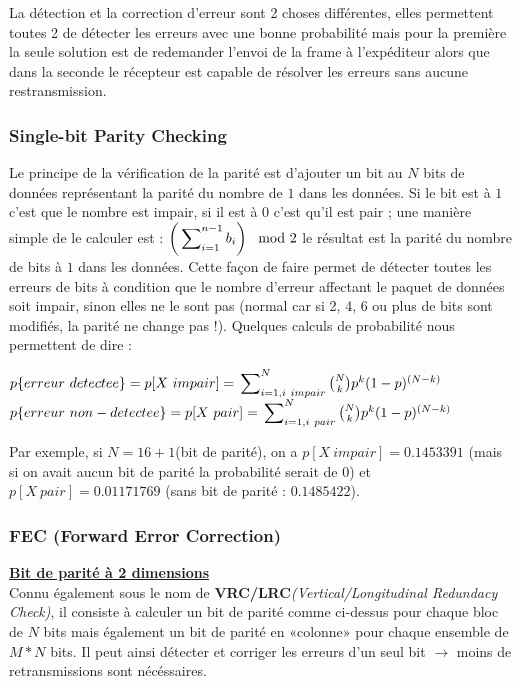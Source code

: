 \documentclass{article}
\newcommand{\sumin}[3]{\sideset{}{_{i=#1}^{#2}}\sum{#3}}
\begin{document}
La détection et la correction d'erreur sont 2 choses différentes, elles permettent toutes 2 de détecter les 
erreurs avec une bonne probabilité mais pour la première la seule solution est de redemander l'envoi de la frame 
à l'expéditeur alors que dans la seconde le récepteur est capable de résolver les erreurs sans aucune 
restransmission.

\subsubsection{Single-bit Parity Checking}

Le principe de la vérification de la parité est d'ajouter un bit au $N$ bits de données représentant la parité du
nombre de $1$ dans les données. Si le bit est à $1$ c'est que le nombre est impair, si il est à $0$ c'est qu'il 
est pair ; une manière simple de le calculer est : $\left(\sumin{1}{n-1}{b_i}\right) \mod 2$ le résultat est la
parité du nombre de bits à $1$ dans les données. Cette façon de faire permet de détecter toutes les erreurs de 
bits à condition que le nombre d'erreur affectant le paquet de données soit impair, sinon elles ne le sont pas 
(normal car si 2, 4, 6 ou plus de bits sont modifiés, la parité ne change pas !). Quelques calculs de probabilité
nous permettent de dire : 
\begin{center}
$p\{erreur\ detectee\} = p[X\ impair] = \sumin{1,i\ impair}{N}{\binom{N}{k}p^k(1-p)^{(N-k)}}$
$p\{erreur\ non-detectee\} = p[X\ pair] = \sumin{1,i\ pair}{N}{\binom{N}{k}p^k(1-p)^{(N-k)}}$
\end{center}

Par exemple, si $N=16+1$(bit de parité), on a $p[X\ impair] = 0.1453391$ (mais si on avait aucun bit de parité la 
probabilité serait de $0$) et $p[X\ pair] = 0.01171769$ (sans bit de parité : $0.1485422$).

\subsubsection{FEC (Forward Error Correction)}

\noindent\textbf{\underline{Bit de parité à 2 dimensions}} \\

\noindent Connu également sous le nom de \textbf{VRC/LRC}\textit{(Vertical/Longitudinal Redundacy Check)}, il 
consiste à calculer un bit de parité comme ci-dessus pour chaque bloc de $N$ bits mais également un bit de parité 
en «colonne» pour chaque ensemble de $M*N$ bits. Il peut ainsi détecter et corriger les erreurs d'un seul bit 
$\rightarrow$ moins de retransmissions sont nécéssaires.
\end{document}
